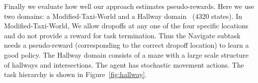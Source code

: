						



Finally we evaluate how well our approach estimates pseudo-rewards. Here we use two domains: a {\sf Modified-Taxi-World} and a
{\sf Hallway} domain~\cite{d-hrl-00,parr:thesis} (4320 states). In {\sf Modified-Taxi-World}, We allow dropoffs at any one of the four specific locations and do not provide a reward for task
termination. Thus the Navigate subtask needs a pseudo-reward
(corresponding to the correct dropoff location) to learn a good policy.
The {\sf Hallway} domain consists of a maze with a large scale
structure of hallways and intersections. The agent has stochastic movement actions. The task hierarchy is shown in Figure~\ref{fig:hallway}. 

